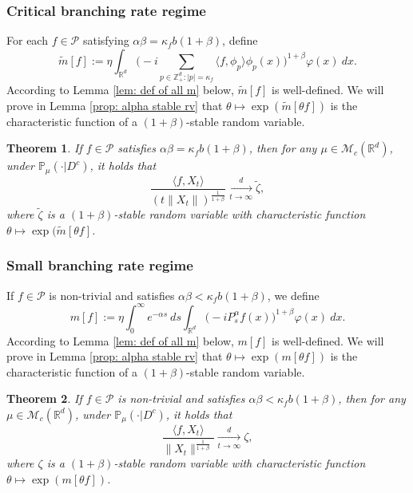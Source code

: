 \documentclass[12pt,a4paper]{amsart}
\theoremstyle{plain}
\newtheorem{thm}{Theorem}[section]
\theoremstyle{definition}
\numberwithin{equation}{section}
\begin{document}
\subsubsection{Critical branching rate regime}
    For each $f\in \mathcal{P}$ satisfying $\alpha\beta=\kappa_f b(1+\beta)$, define
\begin{equation}\label{tilde-m}
    \widetilde{m}[f]
        := \eta\int_{\mathbb R^d} \Big(-i\sum_{p\in \mathbb Z_+^d:|p|=\kappa_f}\langle f,\phi_p\rangle\phi_p(x)\Big)^{1+\beta} \varphi(x)~dx.
\end{equation}
    According to Lemma \ref{lem: def of all m} below, $\widetilde m[f]$ is well-defined.
   We will prove in Lemma \ref{prop: alpha stable rv} that
   $\theta \mapsto \exp( \widetilde m[\theta f])$ is the characteristic function of a $(1+\beta)$-stable random variable.
\begin{thm}
\label{thm: critical clt}
    If $f\in\mathcal{P}$ satisfies  $\alpha\beta=\kappa_fb(1+\beta)$, then for any $\mu\in \mathcal M_c(\mathbb R^d)$,
    under $\mathbb{P}_{\mu}(\cdot|D^c)$,
    it holds that
\[
    \frac{\langle f,X_t\rangle}{\left(t\|X_t\|\right)^{\frac{1}{1+\beta}}}
        \xrightarrow[t\to \infty]{d} \widetilde{\zeta},
\]
    where $\widetilde{\zeta}$ is a $(1+\beta)$-stable random variable with
    characteristic function
$\theta\mapsto \exp(\widetilde{m}[\theta f]$.
\end{thm}

\subsubsection{Small branching rate regime}
\label{msmallcase}
	If $f\in \mathcal{P}$ is non-trivial and satisfies  $\alpha\beta<\kappa_f b(1+\beta)$,
	we define
\begin{equation}
    m[f]
    :=\eta \int_0^{\infty} e^{-\alpha s} ~ds\int_{\mathbb R^d} \big(-iP_s^\alpha f(x)\big)^{1+\beta} \varphi(x)~dx.
\end{equation}
	According to Lemma \ref{lem: def of all m} below, $m[f]$ is well-defined.
	We will prove  in Lemma \ref{prop: alpha stable rv} that $\theta \mapsto \exp( m[\theta f])$ is the characteristic function of a $(1+\beta)$-stable random variable.
\begin{thm}
\label{thm: small clt}
       If $f\in\mathcal{P}$ is non-trivial and satisfies $\alpha\beta<\kappa_f b(1+\beta)$,
    then for any $\mu\in \mathcal M_c(\mathbb R^d)$, under $\mathbb{P}_{\mu}(\cdot|D^c)$, it holds that
\[
        \frac{\langle f,X_t\rangle}{\|X_t\|^{\frac{1}{1+\beta}}}\xrightarrow[t\rightarrow \infty]{d} \zeta,
\]
    where $\zeta$ is a $(1+\beta)$-stable random variable with
characteristic function $\theta\mapsto \exp(m[\theta f])$.
\end{thm}
\end{document}
